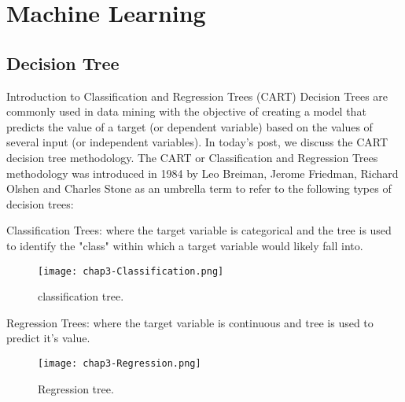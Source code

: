 \chapter{Machine Learning} %

\label{Chapter3} %


\section{Decision Tree}

\begin{compactitem}

\item {Introduction to Classification and Regression Trees (CART)}
Decision Trees are commonly used in data mining with the objective of creating a model that predicts the value of a target (or dependent variable) based on the values of several input (or independent variables).  In today's post, we discuss the CART decision tree methodology.  The CART or Classification and Regression Trees methodology was introduced in 1984 by Leo Breiman, Jerome Friedman, Richard Olshen and Charles Stone as an umbrella term to refer to the following types of decision trees:\cite{blog-CART-Intro}

\item {Classification Trees}: where the target variable is categorical and the tree is used to identify the "class" within which a target variable would likely fall into.

\begin{figure}[ht]
  \label{fig:chap3-Classification}
  \centering
	\texttt{[image: chap3-Classification.png]}
	\caption{classification tree.}
\end{figure}

\item {Regression Trees}: where the target variable is continuous and tree is used to predict it's value.
\begin{figure}[ht]
  \label{fig:chap3-Regression}
  \centering
	\texttt{[image: chap3-Regression.png]}
	\caption{Regression tree.}
\end{figure}


\end{compactitem}
